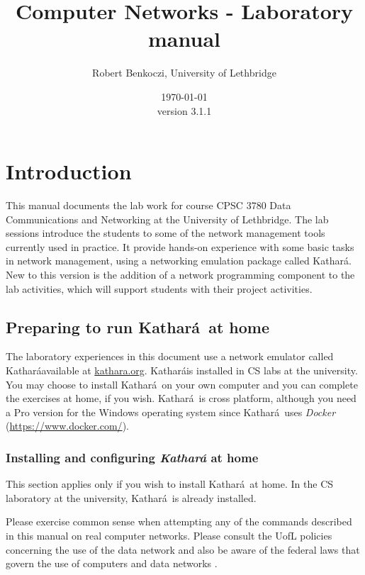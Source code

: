 \documentclass[12pt]{book}
\title{Computer Networks - Laboratory manual}    %
\author{Robert Benkoczi, University of Lethbridge}    %
\date{\today\\ version 3.1.1}  %
\newcommand{\kathara}{Kathar\'a}
\begin{document}
\frontmatter                            %
\maketitle    
\doclicenseThis                      
\tableofcontents                        %

\mainmatter %

\chapter{Introduction}

This manual documents the lab work for course CPSC 3780 Data Communications and Networking at the University of Lethbridge. The lab sessions introduce the students to some of the network management tools currently used in practice. It provide hands-on experience with some basic tasks in network management, using a networking emulation package called \kathara. New to this version is the addition of a network programming component to the lab activities, which will support students with their project activities.


\section{Preparing to run \kathara\ at home}\label{intro.se}

The laboratory experiences in this document use a network emulator called \kathara available at \url{kathara.org}. \kathara is installed in CS labs at the university. You may choose to install \kathara\ on your own computer and you can complete the exercises at home, if you wish. \kathara\ is cross platform, although you need a Pro version for the Windows operating system since \kathara\ uses \emph{Docker} (\url{https://www.docker.com/}).

\subsection{Installing and configuring \emph{\kathara} at home}

This section applies only if you wish to install \kathara\ at home. In the CS laboratory at the university, \kathara\ is already installed.

\begin{tcolorbox}[title=Lab safety note]
  Please exercise common sense when attempting any
  of the commands described in this manual on real computer
  networks. Please consult the UofL policies concerning the use of the
  data network \cite{its-policies} and also be aware of the federal
  laws that govern the use of computers and data networks
  \cite{law-canada,law-us}. 
\end{tcolorbox}
\end{document}
